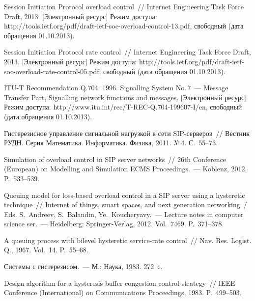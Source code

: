 \begin{multicols}{2}
{{\begin{thebibliography}{99}
Session Initiation Protocol overload control~//
Internet Engineering Task Force Draft, 2013. [Электронный ресурс] Режим доступа:
{\sf http://tools.ietf.org/pdf/draft-ietf-soc-overload-control-13.pdf},
свободный (дата обращения 01.10.2013).

Session Initiation Protocol rate control~//
Internet Engineering Task Force Draft, 2013. [Электронный ресурс] Режим доступа:
{\sf http://tools.ietf.org/pdf/draft-ietf-soc-overload-rate-control-05.pdf},
свободный (дата обращения 01.10.2013).

ITU-T Recommendation Q.704. 1996. Signalling System No.\,7~--- Message Transfer
Part, Signalling network functions and messages. [Электронный ресурс] Режим доступа:
{\sf http://www.itu.int/rec/T-REC-Q.704-199607-I/en},
свободный (дата обращения 01.10.2013).

Гистерезисное управление сигнальной нагрузкой в сети
SIP-сер\-ве\-ров~// Вестник РУДН. Серия Математика. Информатика.
Физика, 2011. №\,4. С.~55--73.

Simulation of overload control in SIP server networks~//
26th  Conference (European) on Modelling and
Simulation ECMS Proceedings.~--- Koblenz, 2012. P.~533--539.

Queuing model for loss-based overload control
in a SIP server using a hysteretic technique~// Internet of things, smart spaces, and
next generation networking~/ Eds. S.~Andreev, S.~Balandin, Ye.~Koucheryavy.~---
Lecture notes in computer science ser.~--- 
Heidelberg: Springer-Verlag, 2012.
Vol.~7469. P.~371--378.

A queuing process with bilevel hysteretic
service-rate control~// Nav. Res. Logist. Q., 1967. Vol.~14. P.~55--68.

Системы с гис\-те\-ре\-зи\-сом.~--- М.: Наука, 1983. 272~с.

Design algorithm for a hysteresis buffer
congestion control strategy~//
IEEE Conference (International) on Communications Proceedings, 1983. P.~499--503.


\end{thebibliography}}}
\end{multicols}
